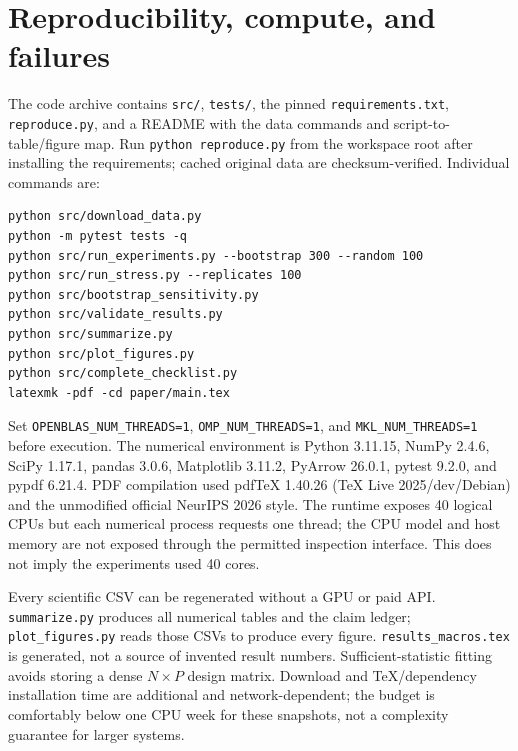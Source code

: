 \clearpage
\section{Reproducibility, compute, and failures}\label{app:reproduce}
The code archive contains \texttt{src/}, \texttt{tests/}, the pinned \texttt{requirements.txt}, \texttt{reproduce.py}, and a README with the data commands and script-to-table/figure map. Run \texttt{python reproduce.py} from the workspace root after installing the requirements; cached original data are checksum-verified. Individual commands are:
\begin{verbatim}
python src/download_data.py
python -m pytest tests -q
python src/run_experiments.py --bootstrap 300 --random 100
python src/run_stress.py --replicates 100
python src/bootstrap_sensitivity.py
python src/validate_results.py
python src/summarize.py
python src/plot_figures.py
python src/complete_checklist.py
latexmk -pdf -cd paper/main.tex
\end{verbatim}
Set \texttt{OPENBLAS\_NUM\_THREADS=1}, \texttt{OMP\_NUM\_THREADS=1}, and \texttt{MKL\_NUM\_THREADS=1} before execution. The numerical environment is Python 3.11.15, NumPy 2.4.6, SciPy 1.17.1, pandas 3.0.6, Matplotlib 3.11.2, PyArrow 26.0.1, pytest 9.2.0, and pypdf 6.21.4. PDF compilation used pdfTeX 1.40.26 (TeX Live 2025/dev/Debian) and the unmodified official NeurIPS 2026 style. The runtime exposes 40 logical CPUs but each numerical process requests one thread; the CPU model and host memory are not exposed through the permitted inspection interface. This does not imply the experiments used 40 cores.


Every scientific CSV can be regenerated without a GPU or paid API. \texttt{summarize.py} produces all numerical tables and the claim ledger; \texttt{plot\_figures.py} reads those CSVs to produce every figure. \texttt{results\_macros.tex} is generated, not a source of invented result numbers. Sufficient-statistic fitting avoids storing a dense $N\times P$ design matrix. Download and TeX/dependency installation time are additional and network-dependent; the budget is comfortably below one CPU week for these snapshots, not a complexity guarantee for larger systems.

